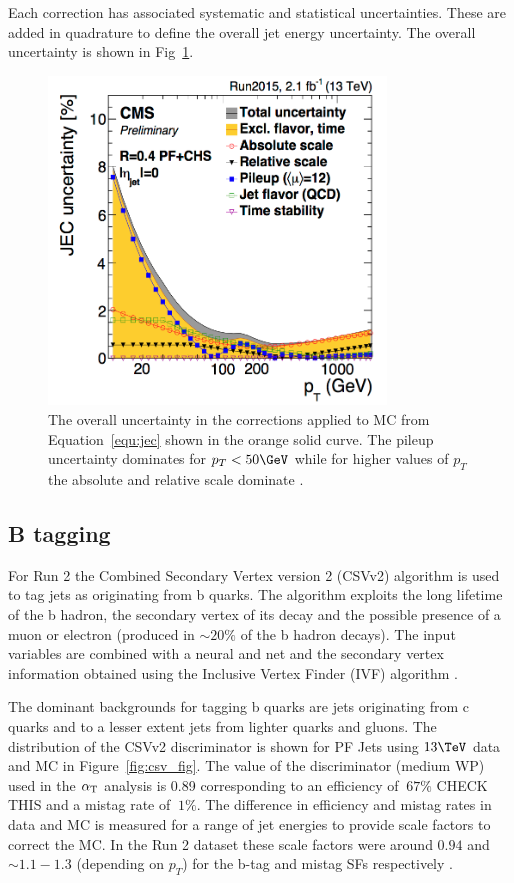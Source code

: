 Each correction has associated systematic and statistical uncertainties. These are added in quadrature to define the overall jet energy uncertainty. The 
overall uncertainty is shown in Fig~\ref{fig:jec_unc}.

\begin{figure}
\centering
    \includegraphics[width=0.8\textwidth]{./Figures/reconstruction/jec_unc.png}
  \caption{\label{fig:jec_unc} The overall uncertainty in the corrections applied to MC from Equation~\ref{equ:jec} shown in the orange solid curve. The pileup uncertainty dominates
for $p_T < 50\GeV$ while for higher values of $p_T$ the absolute and relative scale dominate \cite{jec_fig}.}
\end{figure}

\subsection{B tagging}

For Run 2 the Combined Secondary Vertex version 2 (CSVv2) algorithm is used to tag jets as originating
from b quarks. The algorithm exploits the long lifetime of the b hadron, the secondary vertex of its decay
and the possible presence of a muon or electron (produced in $\sim 20\%$ of the b hadron decays). The 
input variables are combined with a neural and net and the secondary vertex information obtained using
the Inclusive Vertex Finder (IVF) algorithm \cite{csv_pas}.

The dominant backgrounds for tagging b quarks are jets originating from c quarks and to a lesser extent
jets from lighter quarks and gluons. The distribution of the CSVv2 discriminator is shown for PF Jets
using $13\TeV$ data and MC in Figure~\ref{fig:csv_fig}. The value of the discriminator (medium WP)
used in the $\alpha_{\text{T}}$ analysis is 0.89 corresponding to an efficiency of $~67\%$ CHECK THIS and 
a mistag rate of $~1\%$. The difference in efficiency and mistag rates in data and MC is measured 
for a range of jet energies to provide scale factors to correct the MC. In the Run 2 dataset these scale 
factors were around $0.94$ and $\sim1.1-1.3$ (depending on $p_T$) for the b-tag and mistag SFs 
respectively \cite{csv_fig}.

